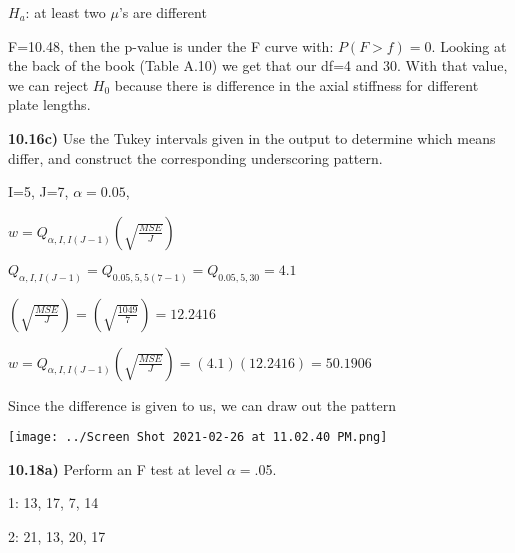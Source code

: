 \documentclass{article}
\begin{document}
$H_{a}$:  at least two $\mu$'s are different

\vspace{2mm}

F=10.48, then the p-value is under the F curve with: $P(F>f)=0$. Looking at the back of the book (Table A.10) we get that our df=4 and 30. With that value, we can reject $H_{0}$ because there is difference in the axial stiffness for different plate lengths.

\vspace{5mm}



\textbf{10.16c)} Use the Tukey intervals given in the output to determine which means differ, and construct the corresponding underscoring pattern.

\vspace{2mm}

I=5, J=7, $\alpha=0.05$, 

\vspace{2mm}

$w=Q_{\alpha, I, I(J-1)} (\sqrt{\frac{MSE}{J}})$

\vspace{2mm}

$Q_{\alpha, I, I(J-1)}=Q_{0.05, 5, 5(7-1)} =Q_{0.05, 5, 30}=4.1$

\vspace{2mm}

$(\sqrt{\frac{MSE}{J}})=(\sqrt{\frac{1049}{7}})=12.2416$

\vspace{2mm}

$w=Q_{\alpha, I, I(J-1)} (\sqrt{\frac{MSE}{J}})=(4.1)(12.2416)=50.1906$

\vspace{2mm}

Since the difference is given to us, we can draw out the pattern

\vspace{2mm}

\texttt{[image: ../Screen Shot 2021-02-26 at 11.02.40 PM.png]}


\textbf{10.18a)} Perform an F test at level $\alpha=$.05.

\vspace{2mm}

1: 13, 17, 7, 14

\vspace{2mm}

2: 21, 13, 20, 17

\vspace{2mm}
\end{document}
